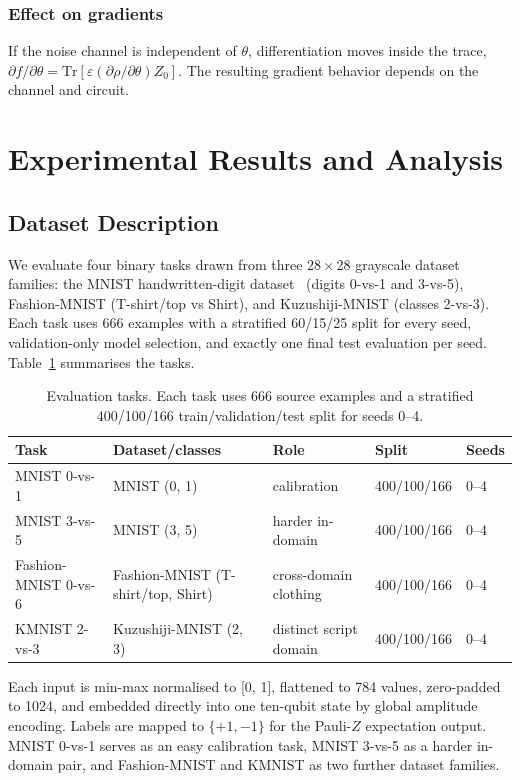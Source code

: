 \documentclass[conference]{IEEEtran}
\begin{document}
\subsubsection{Effect on gradients}
If the noise channel is independent of $\theta$, differentiation moves inside the trace, $\partial f/\partial\theta = \text{Tr}[\varepsilon(\partial\rho/\partial\theta)Z_0]$. The resulting gradient behavior depends on the channel and circuit.

\section{Experimental Results and Analysis}
\subsection{Dataset Description}
We evaluate four binary tasks drawn from three $28\times28$ grayscale dataset families: the MNIST handwritten-digit dataset~\cite{ref49} (digits 0-vs-1 and 3-vs-5), Fashion-MNIST (T-shirt/top vs Shirt), and Kuzushiji-MNIST (classes 2-vs-3). Each task uses 666 examples with a stratified 60/15/25 split for every seed, validation-only model selection, and exactly one final test evaluation per seed. Table~\ref{tab:q1data} summarises the tasks.

\begin{table}[!t]
\caption{Evaluation tasks. Each task uses 666 source examples and a stratified 400/100/166 train/validation/test split for seeds 0--4.}
\label{tab:q1data}
\centering
\begin{tabular}{@{}lllll@{}}
\toprule
\textbf{Task} & \textbf{Dataset/classes} & \textbf{Role} & \textbf{Split} & \textbf{Seeds} \\
\midrule
MNIST 0-vs-1 & MNIST (0, 1) & calibration & 400/100/166 & 0--4 \\
MNIST 3-vs-5 & MNIST (3, 5) & harder in-domain & 400/100/166 & 0--4 \\
Fashion-MNIST 0-vs-6 & Fashion-MNIST (T-shirt/top, Shirt) & cross-domain clothing & 400/100/166 & 0--4 \\
KMNIST 2-vs-3 & Kuzushiji-MNIST (2, 3) & distinct script domain & 400/100/166 & 0--4 \\
\bottomrule
\end{tabular}
\end{table}

Each input is min-max normalised to [0, 1], flattened to 784 values, zero-padded to 1024, and embedded directly into one ten-qubit state by global amplitude encoding.  Labels are mapped to $\{+1, -1\}$ for the Pauli-$Z$ expectation output. MNIST 0-vs-1 serves as an easy calibration task, MNIST 3-vs-5 as a harder in-domain pair, and Fashion-MNIST and KMNIST as two further dataset families.
\end{document}
